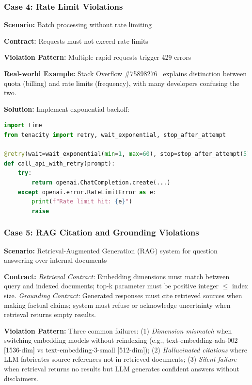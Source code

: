 \documentclass[11pt]{article}
\begin{document}
\subsubsection{Case 4: Rate Limit Violations}
\textbf{Scenario:} Batch processing without rate limiting

\textbf{Contract:} Requests must not exceed rate limits

\textbf{Violation Pattern:} Multiple rapid requests trigger 429 errors

\textbf{Real-world Example:} Stack Overflow \#75898276~\cite{stackoverflow75898276} explains distinction between quota (billing) and rate limits (frequency), with many developers confusing the two.

\textbf{Solution:} Implement exponential backoff:
\begin{lstlisting}[language=Python]
import time
from tenacity import retry, wait_exponential, stop_after_attempt

@retry(wait=wait_exponential(min=1, max=60), stop=stop_after_attempt(5))
def call_api_with_retry(prompt):
    try:
        return openai.ChatCompletion.create(...)
    except openai.error.RateLimitError as e:
        print(f"Rate limit hit: {e}")
        raise
\end{lstlisting}

\subsubsection{Case 5: RAG Citation and Grounding Violations}
\textbf{Scenario:} Retrieval-Augmented Generation (RAG) system for question answering over internal documents

\textbf{Contract:} \textit{Retrieval Contract:} Embedding dimensions must match between query and indexed documents; top-k parameter must be positive integer $\leq$ index size. \textit{Grounding Contract:} Generated responses must cite retrieved sources when making factual claims; system must refuse or acknowledge uncertainty when retrieval returns empty results.

\textbf{Violation Pattern:} Three common failures: (1) \textit{Dimension mismatch} when switching embedding models without reindexing (e.g., text-embedding-ada-002 [1536-dim] vs text-embedding-3-small [512-dim]); (2) \textit{Hallucinated citations} where LLM fabricates source references not in retrieved documents; (3) \textit{Silent failure} when retrieval returns no results but LLM generates confident answers without disclaimers.
\end{document}
